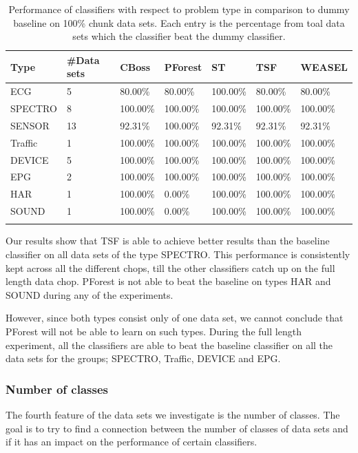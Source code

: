 \begin{table}[hp!]
	\setlength\extrarowheight{2pt} %
	\begin{tabularx}{\textwidth}{|X|X|X|X|X|X|X|}
	\hline
	\textbf{Type} & \textbf{\#Data sets} & \textbf{CBoss} & \textbf{PForest} & \textbf{ST} & \textbf{TSF} & \textbf{WEASEL} \\ \hline
		ECG & 5 & 80.00\% & 80.00\% & 100.00\% & 80.00\% & 80.00\% \\ \hline
		SPECTRO & 8 &100.00\% & 100.00\% & 100.00\% & 100.00\% & 100.00\% \\ \hline
		SENSOR & 13 & 92.31\% & 100.00\% & 92.31\% & 92.31\% & 92.31\% \\ \hline
		Traffic & 1 & 100.00\% & 100.00\% & 100.00\% & 100.00\% & 100.00\% \\ \hline
		DEVICE & 5 & 100.00\% & 100.00\% & 100.00\% & 100.00\% & 100.00\% \\ \hline
		EPG & 2 & 100.00\% & 100.00\% & 100.00\% & 100.00\% & 100.00\% \\ \hline
		HAR & 1 & 100.00\% & 0.00\% & 100.00\% & 100.00\% & 100.00\% \\ \hline
		SOUND & 1 & 100.00\% & 0.00\% & 100.00\% & 100.00\% & 100.00\% \\ \hline
  \caption{Performance of classifiers with respect to problem type in comparison to dummy baseline on 100\% chunk data sets. Each entry is the percentage from toal data sets which the classifier beat the dummy classifier.}
  \label{TableType100}
  \end{tabularx}
\end{table}

Our results show that TSF is able to achieve better results than the baseline classifier on all data sets of the type SPECTRO.
This performance is consistently kept across all the different chops, till the other classifiers catch up on the full length data chop.
PForest is not able to beat the baseline on types HAR and SOUND during any of the experiments.

However, since both types consist only of one data set, we cannot conclude that PForest will not be able to learn on such types.
During the full length experiment, all the classifiers are able to beat the baseline classifier on all the data sets for the groups; SPECTRO, Traffic, DEVICE and EPG.


\subsubsection{Number of classes}
The fourth feature of the data sets we investigate is the number of classes.
The goal is to try to find a connection between the number of classes of data sets and if it has an impact on the performance of certain classifiers.

